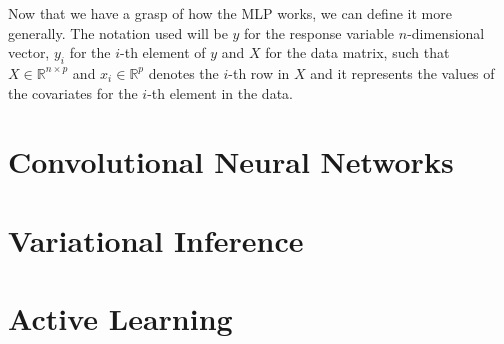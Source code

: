 Now that we have a grasp of how the MLP works, we can define it more generally. The notation used will be $y$ for the response variable $n$-dimensional vector, $y_i$ for the $i$-th element of $y$ and $X$ for the data matrix, such that $X \in \mathbb{R}^{n \times p}$ and $x_i \in \mathbb{R}^p$ denotes the $i$-th row in $X$ and it represents the values of the covariates for the $i$-th element in the data.

\section{Convolutional Neural Networks}

\section{Variational Inference}

\section{Active Learning}
